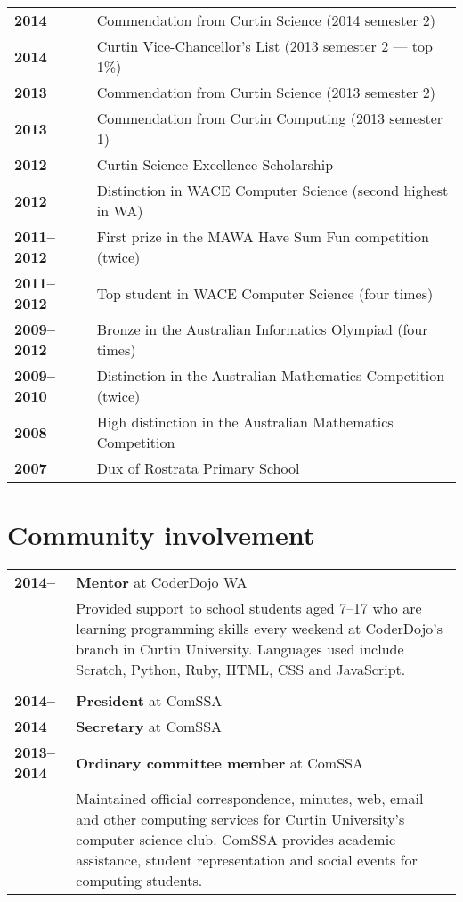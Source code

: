 \documentclass[a4paper,12pt]{article}
\begin{document}
\begin{tabular}{p{3.5cm}p{12.5cm}}
	\textbf{2014} &
		Commendation from Curtin Science (2014 semester 2)\\
	\textbf{2014} &
		Curtin Vice-Chancellor's List (2013 semester 2 --- top 1\%)\\
	\textbf{2013} &
		Commendation from Curtin Science (2013 semester 2)\\
	\textbf{2013} &
		Commendation from Curtin Computing (2013 semester 1)\\
	\textbf{2012} &
		Curtin Science Excellence Scholarship\\
	\textbf{2012} &
		Distinction in WACE Computer Science (second highest in WA)\\
	\textbf{2011--2012} &
		First prize in the MAWA Have Sum Fun competition (twice)\\
	\textbf{2011--2012} &
		Top student in WACE Computer Science (four times)\\
	\textbf{2009--2012} &
		Bronze in the Australian Informatics Olympiad (four times)\\
	\textbf{2009--2010} &
		Distinction in the Australian Mathematics Competition (twice)\\
	\textbf{2008} &
		High distinction in the Australian Mathematics Competition\\
	\textbf{2007} &
		Dux of Rostrata Primary School
\end{tabular}

\section*{Community involvement}

\begin{tabular}{p{3.5cm}p{12.5cm}}
	\textbf{2014--} &
		\textbf{Mentor} at CoderDojo WA\\ &
		Provided support to school students aged 7--17 who are
		learning programming skills every weekend at CoderDojo's
		branch in Curtin University. Languages used include
		Scratch, Python, Ruby, HTML, CSS and JavaScript.\\\\
	\textbf{2014--} &
		\textbf{President} at ComSSA\\
	\textbf{2014} &
		\textbf{Secretary} at ComSSA\\
	\textbf{2013--2014} &
		\textbf{Ordinary committee member} at ComSSA\\ &
		Maintained official correspondence, minutes, web, email and
		other computing services for Curtin University's computer
		science club. ComSSA provides academic assistance, student
		representation and social events for computing students.
\end{tabular}
\end{document}
